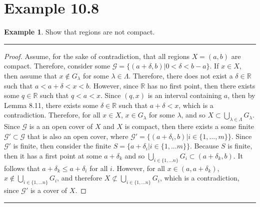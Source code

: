 \documentclass[openany, amssymb, psamsfonts]{amsart}
\newcommand{\bbR}{\mathbb{R}}
\theoremstyle{definition}
\newtheorem{exmp}{Example}[section]
\numberwithin{equation}{section}
\begin{document}
\section*{Example 10.8}
\begin{exmp}
\label{10.8}
Show that regions are not compact.
\end{exmp} 
\vspace{4pt}     \hrule   \vspace{4pt} \begin{proof}
Assume, for the sake of contradiction, that all regions $X=(a,b)$ are compact. Therefore, consider some $\mathcal{G} = \{(a+\delta, b)|0<\delta<b-a\}$. If $x\in X$, then assume that $x\notin G_\lambda$ for some $\lambda\in \Lambda$. Therefore, there does not exist a $\delta\in \bbR$ such that $a<a+\delta<x<b$. However, since $\bbR$ has no first point, then there exists some $q\in \bbR$ such that $q<a<x$. Since $(q,x)$ is an interval containing $a$, then by Lemma 8.11, there exists some $\delta\in \bbR$ such that $a+\delta<x$, which is a contradiction. Therefore, for all $x\in X$, $x\in G_\lambda$ for some $\lambda$, and so $X\subset \bigcup_{\lambda\in \Lambda}G_\lambda$. Since $\mathcal{G}$ is a an open cover of $X$ and $X$ is compact, then there exists a some finite $\mathcal{G'}\subset \mathcal{G}$ that is also an open cover, where $\mathcal{G'} = \{(a+\delta_i, b) |i\in \{1,...,m\}\}$. Since $\mathcal{G'}$ is finite, then consider the finite $S = \{a+\delta_i|i\in \{1,...m\}\}$. Because $S$ is finite, then it has a first point at some $a+\delta_k$ and so $\bigcup_{i\in \{1,...n\}}G_i \subset (a+\delta_k,b)$. It follows that $a+\delta_k\leq a+\delta_i$ for all $i$. However, for all $x\in (a,a+\delta_k)$, $x\notin \bigcup_{i\in \{1,...n\}}G_i$, and therefore $X\not \subset \bigcup_{i\in \{1,...n\}}G_i$, which is a contradiction, since $\mathcal{G}'$ is a cover of $X$.
\end{proof} \vspace{4pt}     \hrule   \vspace{4pt}
\end{document}
